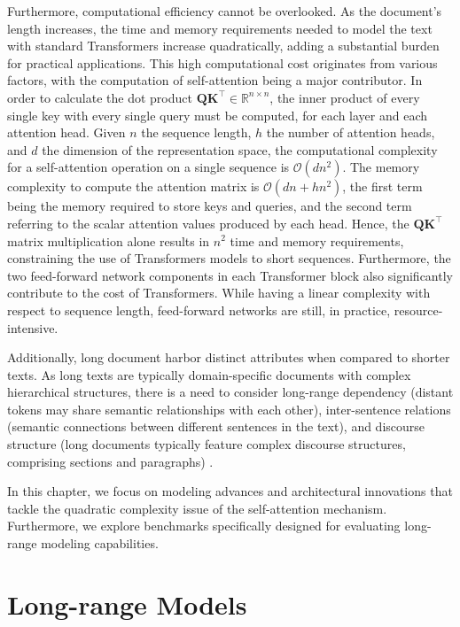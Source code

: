 Furthermore, computational efficiency cannot be overlooked. As the document's length increases, the time and memory requirements needed to model the text with standard Transformers increase quadratically, adding a substantial burden for practical applications. This high computational cost originates from various factors, with the computation of self-attention being a major contributor. In order to calculate the dot product $\bm{Q}\bm{K}^{\top} \in \mathbb{R}^{n \times n}$, the inner product of every single key with every single query must be computed, for each layer and each attention head. Given $n$ the sequence length, $h$ the number of attention heads, and $d$ the dimension of the representation space, the computational complexity for a self-attention operation on a single sequence is $\mathcal{O}(dn^2)$. The memory complexity to compute the attention matrix is $\mathcal{O}(dn + hn^2)$, the first term being the memory required to store keys and queries, and the second term referring to the scalar attention values produced by each head. Hence, the $\bm{Q}\bm{K}^{\top}$ matrix multiplication alone results in $n^2$ time and memory requirements, constraining the use of Transformers models to short sequences. Furthermore, the two feed-forward network components in each Transformer block also significantly contribute to the cost of Transformers. While having a linear complexity with respect to sequence length, feed-forward networks are still, in practice, resource-intensive.

Additionally, long document harbor distinct attributes when compared to shorter texts. As long texts are typically domain-specific documents with complex hierarchical structures, there is a need to consider long-range dependency (distant tokens may share semantic relationships with each other), inter-sentence relations (semantic connections between different sentences in the text), and discourse structure (long documents typically feature complex discourse structures, comprising sections and paragraphs) \citep{dong2023survey}.

In this chapter, we focus on modeling advances and architectural innovations that tackle the quadratic complexity issue of the self-attention mechanism. Furthermore, we explore benchmarks specifically designed for evaluating long-range modeling capabilities.

\section{Long-range Models}

